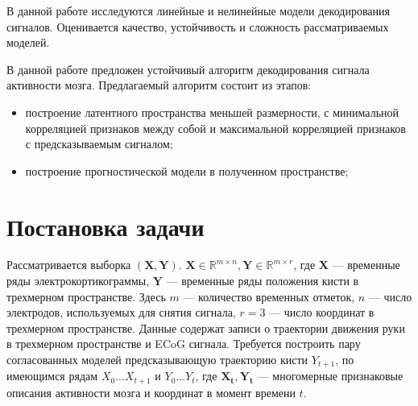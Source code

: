 \documentclass{article}
\begin{document}
\par
В данной работе исследуются линейные и нелинейные модели декодирования сигналов. Оценивается качество, устойчивость и сложность рассматриваемых моделей. \par
В данной работе предложен устойчивый алгоритм декодирования сигнала активности мозга. Предлагаемый алгоритм состоит из этапов:
\begin{itemize}
    \item построение латентного пространства меньшей размерности, с минимальной корреляцией признаков между собой и максимальной корреляцией признаков с предсказываемым сигналом;
    \item построение прогностической модели в полученном пространстве;
\end{itemize}

\section{Постановка задачи}

Рассматривается выборка $(\mathbf{X}, \mathbf{Y}).$ $ \mathbf{X} \in \mathbb{R}^{m \times n},\mathbf{Y} \in \mathbb{R}^{m \times r}$, где $\mathbf{X}$ --- временные ряды электрокортикограммы, $\mathbf{Y}$ --- временные ряды положения кисти в трехмерном пространстве. Здесь $m$ --- количество временных отметок, $n$ ---  число электродов, используемых для снятия сигнала, $r = 3$ --- число координат в трехмерном пространстве. Данные содержат записи о траектории движения руки в трехмерном пространстве и ECoG сигнала. Требуется построить пару согласованных моделей предсказывающую траекторию кисти $Y_{t+1}$, по имеющимся рядам $X_0 \dots X_{t+1}$ и $Y_0 \dots Y_t$, где $\mathbf{X_t}, \mathbf{Y_t}$ --- многомерные признаковые описания активности мозга и координат в момент времени $t$.
\end{document}

